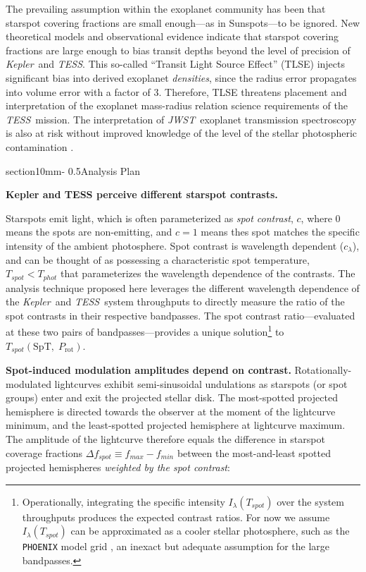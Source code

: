 \documentclass[letterpaper,11pt]{article}
\makeatletter
\renewcommand{\section}{\@startsection%
{section}{1}{0mm}{-\baselineskip}%
{0.5\baselineskip}{\normalfont\Large\bfseries}}%
\newcommand{\tess}{{\it TESS}}
\newcommand{\jwst}{{\it JWST}}
\newcommand{\kepler}{{\it Kepler}}
\makeatother
\begin{document}
The prevailing assumption within the exoplanet community has been that starspot covering fractions are small enough---as in Sunspots---to be ignored.  New theoretical models \citep{2018ApJ...853..122R} and observational evidence \citep{2016MNRAS.463.2494F} indicate that starspot covering fractions are large enough to bias transit depths beyond the level of precision of \kepler\ and \tess.  This so-called ``Transit Light Source Effect'' (TLSE) injects significant bias into derived exoplanet \emph{densities}, since the radius error propagates into volume error with a factor of 3.  Therefore, TLSE threatens placement and interpretation of the exoplanet mass-radius relation science requirements of the \tess\ mission.  The interpretation of \jwst\ exoplanet transmission spectroscopy is also at risk without improved knowledge of the level of the stellar photospheric contamination \citep{2019AJ....157...11W}.

\section{Analysis Plan}

\textbf{Kepler and TESS perceive different starspot contrasts.}

Starspots emit light, which is often parameterized as \emph{spot contrast}, $c$, where 0 means the spots are non-emitting, and $c=1$ means thes spot matches the specific intensity of the ambient photosphere.  Spot contrast is wavelength dependent ($c_\lambda$), and can be thought of as possessing a characteristic spot temperature, $T_{spot}<T_{phot}$ that parameterizes the wavelength dependence of the contrasts.  The analysis technique proposed here leverages the different wavelength dependence of the \kepler\ and \tess\ system throughputs to directly measure the ratio of the spot contrasts in their respective bandpasses.  The spot contrast ratio---evaluated at these two pairs of bandpasses---provides a unique solution\footnote{Operationally, integrating the specific intensity $I_\lambda(T_{spot})$ over the system throughputs produces the expected contrast ratios.  For now we assume $I_\lambda(T_{spot})$ can be approximated as a cooler stellar photosphere, such as the \texttt{PHOENIX} model grid \citep{2013A&A...553A...6H}, an inexact but adequate assumption for the large bandpasses.} to $T_{spot}(\mathrm{SpT},\;P_{\mathrm{rot}})$.

\textbf{Spot-induced modulation amplitudes depend on contrast.}
Rotationally-modulated lightcurves exhibit semi-sinusoidal undulations as starspots (or spot groups) enter and exit the projected stellar disk.  The most-spotted projected hemisphere is directed towards the observer at the moment of the lightcurve minimum, and the least-spotted projected hemisphere at lightcurve maximum.  The amplitude of the lightcurve therefore equals the difference in starspot coverage fractions $\Delta f_{spot} \equiv f_{max}-f_{min}$ between the most-and-least spotted projected hemispheres \emph{weighted by the spot contrast}:
\end{document}
